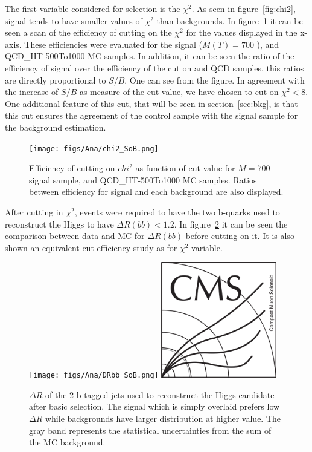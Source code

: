 The first variable considered for selection is the $\chi^{2}$. As seen in figure~\ref{fig:chi2}, signal tends to have smaller values of $\chi^{2}$ than backgrounds. In figure~\ref{fig:chi2cut} it can be seen a scan of the efficiency of cutting on the $\chi^{2}$ for the values displayed in the x-axis. These efficiencies were evaluated for the signal ($M(T)=700$ \GeVcc), \ttbar and QCD\_HT-500To1000 MC samples. In addition, it can be seen the ratio of the efficiency of signal over the efficiency of the cut on \ttbar and QCD samples, this ratios are directly proportional to $S/B$. One can see from the figure. In agreement with the increase of $S/B$ as measure of the cut value, we have chosen to cut on $\chi^{2}<8$. One additional feature of this cut, that will be seen in section~\ref{sec:bkg}, is that this cut ensures the agreement of the control sample with the signal sample for the background estimation. 

\begin{figure}[!Hhtbp]
  \begin{center}
    \texttt{[image: figs/Ana/chi2\_SoB.png]}
    \caption{Efficiency of cutting on $chi^{2}$ as function of cut value for $M=700$ \GeVcc signal sample, \ttbar and QCD\_HT-500To1000 MC samples. Ratios between efficiency for signal and each background are also displayed.}
    \label{fig:chi2cut}
  \end{center}
\end{figure}

After cutting in $\chi^{2}$, events were required to have the two b-quarks used to reconstruct the Higgs to have $\Delta R(bb)<1.2$. In figure~\ref{fig:DRbb} it can be seen the comparison between data and MC for $\Delta R(bb)$ before cutting on it. It is also shown an equivalent cut efficiency study as for $\chi^{2}$ variable. 

\begin{figure}[!Hhtbp]
  \begin{center}
    \texttt{[image: figs/Ana/DRbb\_SoB.png]}
    \includegraphics[width=0.45\textwidth]{figs/CMSlogo.png}
    \caption{$\Delta R$ of the 2 b-tagged jets used to reconstruct the Higgs candidate after basic selection. The signal which is simply overlaid prefers low $\Delta R$ while backgrounds have larger distribution at higher value. The gray band represents the statistical uncertainties from the sum of the MC background.}
    \label{fig:DRbb}
  \end{center}
\end{figure}

